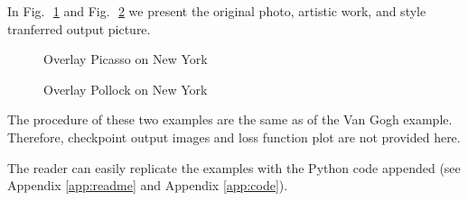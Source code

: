 In Fig.\,~\ref{fig:results:pp} and Fig.\,~\ref{fig:results:jp} we present
the original photo, artistic work, and style tranferred output picture.

    \begin{figure}[!hbt]
    \center
    \caption{Overlay Picasso on New York}
    \label{fig:results:pp}
    \end{figure}

    \begin{figure}[!hbt]
    \center
    \caption{Overlay Pollock on New York}
    \label{fig:results:jp}
    \end{figure}

The procedure of these two examples are the same as of the Van Gogh example.
Therefore, checkpoint output images and loss function plot are not provided here.


The reader can easily replicate the examples with the Python code appended
(see Appendix \ref{app:readme} and Appendix \ref{app:code}).
